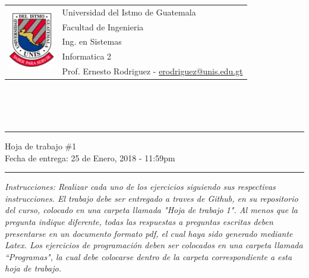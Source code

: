\documentclass{article}
\newcommand{\horrule}[1]{\rule{\linewidth}{#1}}
\newcommand{\perlscript}[2]{
\begin{itemize}
\item[]
\end{itemize}
}
\begin{document}
\begin{tabular}{l l}
\multirow{5}{*}{\includegraphics[width=2cm]{../../Recursos/logo.png}} & Universidad del Istmo de Guatemala \\
 & Facultad de Ingenieria \\
 & Ing. en Sistemas \\
 & Informatica 2 \\
 & Prof. Ernesto Rodriguez - \href{mailto:erodriguez@unis.edu.gt}{erodriguez@unis.edu.gt} \\
\end{tabular}
\\\\\\

\begin{center}
        \horrule{0.5pt}
        \huge{Hoja de trabajo \#1} \\
        \large{Fecha de entrega: 25 de Enero, 2018 - 11:59pm} \\
        \horrule{1pt}
\end{center}

\emph{Instrucciones: Realizar cada uno de los ejercicios siguiendo sus respectivas
instrucciones. El trabajo debe ser entregado a traves de Github, en su repositorio del curso, colocado en una carpeta llamada "Hoja de trabajo 1".
Al menos que la pregunta indique diferente, todas las respuestas a preguntas escritas deben presentarse en
un documento formato pdf, el cual haya sido generado mediante Latex. Los ejercicios de programaci\'on deben ser colocados en una carpeta
llamada ``Programas", la cual debe colocarse dentro de la carpeta correspondiente a esta hoja de trabajo.}

\end{document}

